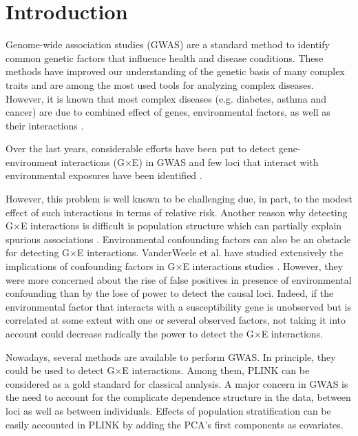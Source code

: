 \documentclass[10pt,a4paper]{article}
\begin{document}
\newpage
\section{Introduction}

Genome-wide association studies (GWAS) are a standard method to identify common genetic factors that influence health and disease conditions. These methods have improved our understanding of the genetic basis of many complex traits and are among the most used tools for analyzing complex diseases.
However, it is known that most complex diseases (e.g. diabetes, asthma and cancer) are due to combined effect of genes, environmental factors, as well as their interactions \citep{murcray2009gene}. 

Over the last years, considerable efforts have been put to detect gene-environment interactions (G$\times$E) in GWAS and few loci that interact with environmental exposures have been identified \citep{rothman2010multi,hamza2011genome, garcia2010analysis}. 

However, this problem is well known to be challenging due, in part, to the modest effect of such interactions in terms of relative risk. 
Another reason why detecting G$\times$E interactions is difficult is population structure which can partially explain spurious associations \citep{astle2009population}.
Environmental confounding factors can also be an obstacle for detecting G$\times$E interactions. VanderWeele et al. have studied extensively the implications of confounding factors in G$\times$E interactions studies  \citep{vanderweele2013environmental, vanderweele2012sensitivity}. However, they were more concerned about the rise of false positives in presence of environmental confounding than by the lose of power to detect the causal loci. Indeed, if the environmental factor that interacts with a susceptibility gene is unobserved but is correlated at some extent with one or several observed factors, not taking it into account could decrease radically the power to detect the G$\times$E interactions.

\vspace{0.3cm}
Nowadays, several methods are available to perform GWAS. In principle, they could be used to detect G$\times$E interactions. Among them, PLINK \citep{purcell2007plink} can be considered as a gold standard for classical analysis. A major concern in GWAS is the need to account for the complicate dependence structure in the data, between loci as well as between individuals. Effects of population stratification can be easily accounted in PLINK by adding the PCA's first components as covariates.
\end{document}

